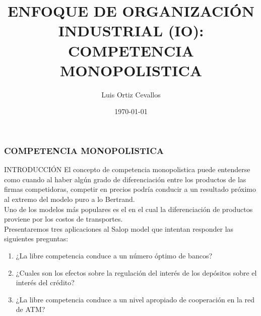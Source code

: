 \documentclass[10pt, xcolor=table, x11names]{beamer}
\title[]{ENFOQUE DE ORGANIZACIÓN INDUSTRIAL (IO): COMPETENCIA MONOPOLISTICA}
\author[Luis Ortiz]{Luis Ortiz Cevallos}
\institute[SECMCA]{\bf SECMCA}
\date[\today]{\footnotesize \today}
\begin{document}
\begin{frame}
\titlepage
\end{frame}


\begin{frame}
    \frametitle{{\normalsize COMPETENCIA MONOPOLISTICA} {}}
    
    \begin{block} {INTRODUCCIÓN}
     El concepto de competencia monopolistica puede entenderse como cuando al haber algún grado de diferenciación entre los productos de las firmas competidoras, competir en precios podría conducir a un resultado próximo al extremo del modelo puro a lo Bertrand.\\
     Uno de los modelos más populares es el \cite{Salop1979} en el cual la diferenciación de productos proviene por los costos de transportes.\\
     Presentaremos tres aplicaciones al Salop model que intentan responder las siguientes preguntas:
     \begin{enumerate}
         \item ¿La libre competencia conduce a un número óptimo de bancos?
         \item ¿Cuales son los efectos sobre la regulación del interés de los depósitos sobre el interés del crédito?
         \item ¿La libre competencia conduce a un nivel apropiado de cooperación en la red de ATM?
     \end{enumerate}
         
    \end{block}	
    
\end{frame}
\end{document}

